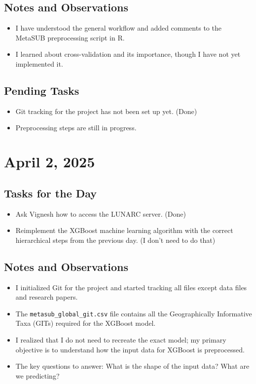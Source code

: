 \documentclass{article}
\begin{document}
\subsection*{Notes and Observations}
\begin{itemize}
    \item I have understood the general workflow and added comments to the MetaSUB preprocessing script in R.
    \item I learned about cross-validation and its importance, though I have not yet implemented it.
\end{itemize}

\subsection*{Pending Tasks}
\begin{itemize}
    \item Git tracking for the project has not been set up yet. (Done)
    \item Preprocessing steps are still in progress.
\end{itemize}

\section{April 2, 2025}

\subsection*{Tasks for the Day}
\begin{itemize}
    \item Ask Vignesh how to access the LUNARC server. (Done)
    \item Reimplement the XGBoost machine learning algorithm with the correct hierarchical steps from the previous day. (I don't need to do that)
\end{itemize}

\subsection*{Notes and Observations}
\begin{itemize}
    \item I initialized Git for the project and started tracking all files except data files and research papers.
    \item The \texttt{metasub\_global\_git.csv} file contains all the Geographically Informative Taxa (GITs) required for the XGBoost model.
    \item I realized that I do not need to recreate the exact model; my primary objective is to understand how the input data for XGBoost is preprocessed.
    \item The key questions to answer: What is the shape of the input data? What are we predicting?
\end{itemize}
\end{document}
